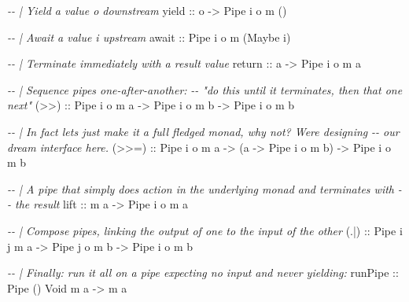 \documentclass[]{article}
\newenvironment{Shaded}{}{}
\newcommand{\CommentTok}[1]{\textcolor[rgb]{0.38,0.63,0.69}{\textit{#1}}}
\newcommand{\DataTypeTok}[1]{\textcolor[rgb]{0.56,0.13,0.00}{#1}}
\newcommand{\FunctionTok}[1]{\textcolor[rgb]{0.02,0.16,0.49}{#1}}
\newcommand{\NormalTok}[1]{#1}
\newcommand{\OtherTok}[1]{\textcolor[rgb]{0.00,0.44,0.13}{#1}}
\begin{document}
\begin{Shaded}
\begin{Highlighting}[]
\CommentTok{{-}{-} | Yield a value \textasciigrave{}o\textasciigrave{} downstream}
\OtherTok{yield ::}\NormalTok{ o }\OtherTok{{-}\textgreater{}} \DataTypeTok{Pipe}\NormalTok{ i o m ()}

\CommentTok{{-}{-} | Await a value \textasciigrave{}i\textasciigrave{} upstream}
\OtherTok{await ::} \DataTypeTok{Pipe}\NormalTok{ i o m (}\DataTypeTok{Maybe}\NormalTok{ i)}

\CommentTok{{-}{-} | Terminate immediately with a result value}
\FunctionTok{return}\OtherTok{ ::}\NormalTok{ a }\OtherTok{{-}\textgreater{}} \DataTypeTok{Pipe}\NormalTok{ i o m a}

\CommentTok{{-}{-} | Sequence pipes one{-}after{-}another:}
\CommentTok{{-}{-} "do this until it terminates, then that one next"}
\OtherTok{(\textgreater{}\textgreater{}) ::} \DataTypeTok{Pipe}\NormalTok{ i o m a }\OtherTok{{-}\textgreater{}} \DataTypeTok{Pipe}\NormalTok{ i o m b }\OtherTok{{-}\textgreater{}} \DataTypeTok{Pipe}\NormalTok{ i o m b}

\CommentTok{{-}{-} | In fact let\textquotesingle{}s just make it a full fledged monad, why not?  We\textquotesingle{}re designing}
\CommentTok{{-}{-} our dream interface here.}
\OtherTok{(\textgreater{}\textgreater{}=) ::} \DataTypeTok{Pipe}\NormalTok{ i o m a }\OtherTok{{-}\textgreater{}}\NormalTok{ (a }\OtherTok{{-}\textgreater{}} \DataTypeTok{Pipe}\NormalTok{ i o m b) }\OtherTok{{-}\textgreater{}} \DataTypeTok{Pipe}\NormalTok{ i o m b}

\CommentTok{{-}{-} | A pipe that simply does action in the underlying monad and terminates with}
\CommentTok{{-}{-} the result}
\OtherTok{lift ::}\NormalTok{ m a }\OtherTok{{-}\textgreater{}} \DataTypeTok{Pipe}\NormalTok{ i o m a}

\CommentTok{{-}{-} | Compose pipes, linking the output of one to the input of the other}
\OtherTok{(.|) ::} \DataTypeTok{Pipe}\NormalTok{ i j m a }\OtherTok{{-}\textgreater{}} \DataTypeTok{Pipe}\NormalTok{ j o m b }\OtherTok{{-}\textgreater{}} \DataTypeTok{Pipe}\NormalTok{ i o m b}

\CommentTok{{-}{-} | Finally: run it all on a pipe expecting no input and never yielding:}
\OtherTok{runPipe ::} \DataTypeTok{Pipe}\NormalTok{ () }\DataTypeTok{Void}\NormalTok{ m a }\OtherTok{{-}\textgreater{}}\NormalTok{ m a}
\end{Highlighting}
\end{Shaded}
\end{document}
